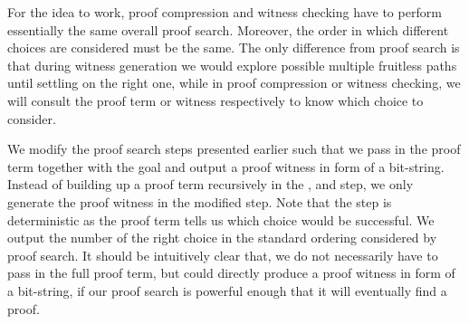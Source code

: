\documentclass{acmconf}
\begin{document}

For the idea to work, proof compression and witness checking have to
perform essentially the same overall proof search. Moreover, the order
in which different choices are considered must be the same.  The only
difference from proof search is that during witness generation we
would explore possible multiple fruitless paths until settling on the
right one, while in proof compression or witness checking, we will
consult the proof term or witness respectively to know which choice to
consider.

We modify the proof search steps presented earlier such that we pass
in the proof term together with the goal and output a proof witness in
form of a bit-string. Instead of building up a proof term recursively
in the {}, {} and {} step, we
only generate the proof witness in the modified {} step.
Note that the {} step is deterministic as the proof term
tells us which choice would be successful. We output the number of the
right choice in the standard ordering considered by proof search. It
should be intuitively clear that, we do not necessarily have to pass
in the full proof term, but could directly produce a proof witness in
form of a bit-string, if our proof search is powerful enough that it
will eventually find a proof.
\end{document}
